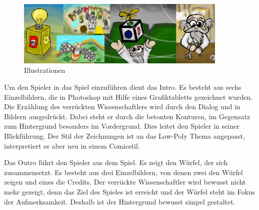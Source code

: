 
\begin{figure}[!htbp]%
	\centering
		\includegraphics[width=0.9\textwidth]{images/illustrationen}
	\caption{Illustrationen}
	\label{fig:Illustrationen}
\end{figure}

Um den Spieler in das Spiel einzuführen dient das Intro. Es besteht aus sechs Einzelbildern, die in Photoshop mit Hilfe eines Grafiktabletts gezeichnet wurden. Die Erzählung des verrückten Wissenschaftlers wird durch den Dialog und in Bildern ausgedrückt. Dabei steht er durch die betonten Konturen, im Gegensatz zum Hintergrund besonders im Vordergrund. Dies leitet den Spieler in seiner Blickführung. Der Stil der Zeichnungen ist an das Low-Poly Thema angepasst, interpretiert es aber neu in einem Comicstil.

Das Outro führt den Spieler aus dem Spiel. Es zeigt den Würfel, der sich zusammensetzt. Es besteht aus drei Einzelbildern, von denen zwei den Würfel zeigen und eines die Credits. Der verrückte Wissenschaftler wird bewusst nicht mehr gezeigt, denn das Ziel des Spieles ist erreicht und der Würfel steht im Fokus der Aufmerksamkeit. Deshalb ist der Hintergrund bewusst simpel gestaltet.